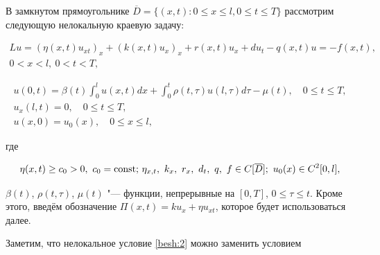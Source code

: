 В замкнутом прямоугольнике $\overline{D}=\{(x,t): 0 \leq x \leq l,

0\leq t\leq T\}$ рассмотрим следующую нелокальную краевую задачу:

\begin{multline}

Lu=(\eta(x,t) u_{xt})_{x} +(k(x,t)u_{x})_{x}+ r(x,t)u_{x}+du_{t}-q(x,t)u =-f(x,t),

\\

0 < x < l,\ 0<t<T,

\label{besh:1}

\end{multline}

\begin{gather}

u(0,t)=\beta(t)\int^{l}_{0}u(x,t)dx +

\int^{t}_{0}\rho(t,\tau)u(l,\tau)d\tau-\mu(t), \quad 0 \leq t \leq T,

\label{besh:2}

\\

u_{x}(l,t)=0, \quad 0 \leq t\leq T, 

\label{besh:3}

\\

u(x, 0)=u_{0}(x), \quad 0 \leq x\leq l, 

\label{besh:4}

\end{gather}

где

\begin{equation}

\eta(x,t)\geq c_{0}>0, \ c_{0}={\rm const;}  \

\eta_{x,t},\ k_{x}, \ r_{x}, \ d_{t}, \ q,\ f \in C[\overline{D}];\

u_{0}(x) \in C^{2}[0, l], 

\label{besh:5}

\end{equation}

$\beta(t)$, $\rho(t,\tau)$, $\mu(t)$ "--- функции, непрерывные на $[0,T]$, $0\leq\tau\leq t$. Кроме этого, введём обозначение $\Pi(x,t)=ku_{x}+\eta u_{xt}$, которое будет использоваться далее.



Заметим, что нелокальное условие \eqref{besh:2} можно заменить условием

$$

